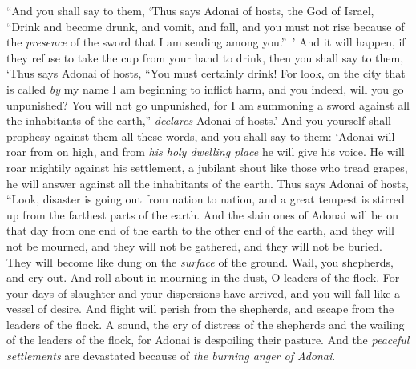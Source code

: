 \begin{biblechapter}
\verse “And you shall say to them, ‘Thus says Adonai of hosts, the God of Israel, “Drink and become drunk, and vomit, and fall, and you must not rise because of the \textit{presence} of the sword that I am sending among you.” ’
\verse And it will happen, if they refuse to take the cup from your hand to drink, then you shall say to them, ‘Thus says Adonai of hosts, “You must certainly drink!
\verse For look, on the city that is called \textit{by} my name I am beginning to inflict harm, and you indeed, will you go unpunished? You will not go unpunished, for I am summoning a sword against all the inhabitants of the earth,” \textit{declares} Adonai of hosts.’
\verse And you yourself shall prophesy against them all these words, and you shall say to them:
\verse ‘Adonai will roar from on high, 
and from \textit{his holy dwelling place} he will give his voice. 
He will roar mightily against his settlement, 
a jubilant shout like those who tread grapes, 
he will answer against all the inhabitants of the earth.
\verse Thus says Adonai of hosts,
\verse “Look, disaster is going out from nation to nation, 
and a great tempest is stirred up from the farthest parts of the earth.
\verse And the slain ones of Adonai will be on that day 
from one end of the earth to the other end of the earth, 
and they will not be mourned, 
and they will not be gathered, 
and they will not be buried. 
They will become like dung on the \textit{surface} of the ground.
\verse Wail, you shepherds, and cry out. 
And roll about in mourning in the dust, O leaders of the flock. 
For your days of slaughter and your dispersions have arrived, 
and you will fall like a vessel of desire.
\verse And flight will perish from the shepherds, 
and escape from the leaders of the flock.
\verse A sound, the cry of distress of the shepherds 
and the wailing of the leaders of the flock, 
for Adonai is despoiling their pasture.
\verse And the \textit{peaceful settlements} are devastated 
because of \textit{the burning anger of Adonai}.
\end{biblechapter}

